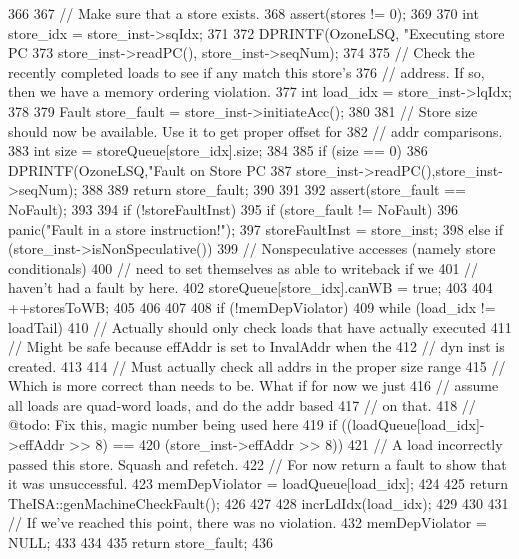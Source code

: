 \begin{DoxyCode}
366 {
367     // Make sure that a store exists.
368     assert(stores != 0);
369 
370     int store_idx = store_inst->sqIdx;
371 
372     DPRINTF(OzoneLSQ, "Executing store PC %
373             store_inst->readPC(), store_inst->seqNum);
374 
375     // Check the recently completed loads to see if any match this store's
376     // address.  If so, then we have a memory ordering violation.
377     int load_idx = store_inst->lqIdx;
378 
379     Fault store_fault = store_inst->initiateAcc();
380 
381     // Store size should now be available.  Use it to get proper offset for
382     // addr comparisons.
383     int size = storeQueue[store_idx].size;
384 
385     if (size == 0) {
386         DPRINTF(OzoneLSQ,"Fault on Store PC %
387                 store_inst->readPC(),store_inst->seqNum);
388 
389         return store_fault;
390     }
391 
392     assert(store_fault == NoFault);
393 
394     if (!storeFaultInst) {
395         if (store_fault != NoFault) {
396             panic("Fault in a store instruction!");
397             storeFaultInst = store_inst;
398         } else if (store_inst->isNonSpeculative()) {
399             // Nonspeculative accesses (namely store conditionals)
400             // need to set themselves as able to writeback if we
401             // haven't had a fault by here.
402             storeQueue[store_idx].canWB = true;
403 
404             ++storesToWB;
405         }
406     }
407 
408     if (!memDepViolator) {
409         while (load_idx != loadTail) {
410             // Actually should only check loads that have actually executed
411             // Might be safe because effAddr is set to InvalAddr when the
412             // dyn inst is created.
413 
414             // Must actually check all addrs in the proper size range
415             // Which is more correct than needs to be.  What if for now we just
416             // assume all loads are quad-word loads, and do the addr based
417             // on that.
418             // @todo: Fix this, magic number being used here
419             if ((loadQueue[load_idx]->effAddr >> 8) ==
420                 (store_inst->effAddr >> 8)) {
421                 // A load incorrectly passed this store.  Squash and refetch.
422                 // For now return a fault to show that it was unsuccessful.
423                 memDepViolator = loadQueue[load_idx];
424 
425                 return TheISA::genMachineCheckFault();
426             }
427 
428             incrLdIdx(load_idx);
429         }
430 
431         // If we've reached this point, there was no violation.
432         memDepViolator = NULL;
433     }
434 
435     return store_fault;
436 }
\end{DoxyCode}
